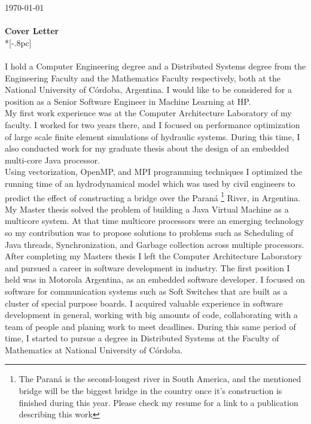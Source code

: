 \documentclass[letter,12pt,english]{article}
\begin{document}
{ \hfill \today \\ \\ 

\large
\bf Cover Letter} \\*[-.8pc]
\\
\\
I hold a Computer Engineering degree and a Distributed Systems degree from the Engineering Faculty
and the Mathematics Faculty respectively, both at the National University of C\'ordoba, Argentina.
I would like to be considered for a position as a Senior Software Engineer in Machine Learning at HP.
\\
My first work experience was at the Computer Architecture Laboratory of my faculty. I worked for two
years there, and I focused on performance optimization of large scale finite element simulations of 
hydraulic systems. During this time, I also conducted work for my graduate thesis about the design
of an embedded multi-core Java processor.\\
Using vectorization, OpenMP, and MPI programming techniques I optimized the running time of an 
hydrodynamical model which was used by civil engineers to predict the effect of constructing a bridge
over the Paran\'a
\footnote{The Paran\'a is the second-longest river in South America, and the mentioned bridge
will be the biggest bridge in the country once it's construction is finished during this year. Please
check my resume for a link to a publication describing this work} River,
in Argentina. \\
My Master thesis solved the problem of building a Java Virtual Machine as a multicore system. At that time
multicore processors were an emerging technology so my contribution was to propose solutions to 
problems such as Scheduling of Java threads, Synchronization, and Garbage collection across multiple
processors. \\
After completing my Masters thesis I left the Computer Architecture Laboratory and pursued a career
in software development in industry. The first position I held was in Motorola Argentina, as an embedded
software developer. I focused on software for communication systems such as Soft Switches that are built
as a cluster of special purpose boards. I acquired valuable experience in software development in general,
working with big amounts of code, collaborating with a team of people and planing work to meet deadlines.
During this same period of time, I started to pursue a degree in Distributed Systems at the Faculty of 
Mathematics at National University of C\'ordoba.
\end{document}
